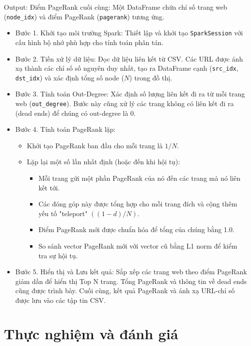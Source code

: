 \documentclass[conference]{IEEEtran}
\begin{document}
Output: {Điểm PageRank cuối cùng:} Một DataFrame chứa chỉ số trang web (\texttt{node\_idx}) và điểm PageRank (\texttt{pagerank}) tương ứng.
\begin{itemize}
    \item Bước 1. Khởi tạo môi trường Spark: Thiết lập và khởi tạo \texttt{SparkSession} với cấu hình bộ nhớ phù hợp cho tính toán phân tán.

    \item Bước 2. Tiền xử lý dữ liệu: Đọc dữ liệu liên kết từ CSV. Các URL được ánh xạ thành các chỉ số số nguyên duy nhất, tạo ra DataFrame cạnh (\texttt{src\_idx}, \texttt{dst\_idx}) và xác định tổng số node ($N$) trong đồ thị.

    \item Bước 3. Tính toán Out-Degree: Xác định số lượng liên kết đi ra từ mỗi trang web (\texttt{out\_degree}). Bước này cũng xử lý các trang không có liên kết đi ra (dead ends) để chúng có out-degree là 0.
    
    \item Bước 4. Tính toán PageRank lặp:
    \begin{itemize}
        \item Khởi tạo PageRank ban đầu cho mỗi trang là $1/N$.
        \item Lặp lại một số lần nhất định (hoặc đến khi hội tụ):
        \begin{itemize}
            \item Mỗi trang gửi một phần PageRank của nó đến các trang mà nó liên kết tới.
            \item Các đóng góp này được tổng hợp cho mỗi trang đích và cộng thêm yếu tố "teleport" $((1-d)/N)$.
            \item Điểm PageRank mới được chuẩn hóa để tổng của chúng bằng 1.0.
            \item So sánh vector PageRank mới với vector cũ bằng L1 norm để kiểm tra sự hội tụ.
        \end{itemize}
    \end{itemize}
    \item Bước 5. Hiển thị và Lưu kết quả: Sắp xếp các trang web theo điểm PageRank giảm dần để hiển thị Top N trang. Tổng PageRank và thông tin về dead ends cũng được trình bày. Cuối cùng, kết quả PageRank và ánh xạ URL-chỉ số được lưu vào các tập tin CSV.
\end{itemize}
\section{Thực nghiệm và đánh giá}
\end{document}
